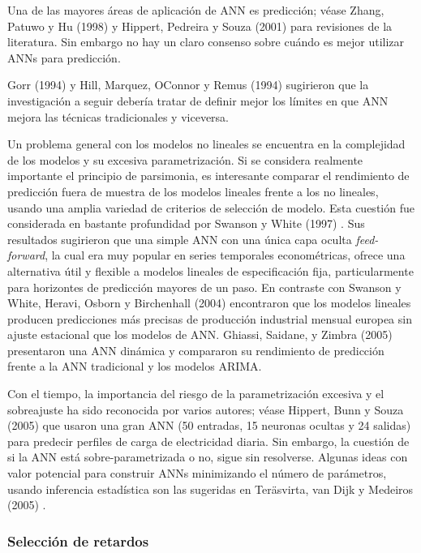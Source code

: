 \documentclass{llncs}
\begin{document}
Una de las mayores áreas de aplicación de ANN es predicción; véase Zhang, Patuwo y Hu (1998) \cite{Zhang199835} y Hippert, Pedreira y Souza (2001) \cite{Hippert200144} para revisiones de la literatura. Sin embargo no hay un claro consenso sobre cuándo es mejor utilizar ANNs para predicción.

Gorr (1994) \cite{Gorr19941} y Hill, Marquez, OConnor y Remus (1994) \cite{Hill19945} sugirieron que la investigación a seguir debería tratar de definir mejor los límites en que ANN mejora las técnicas tradicionales y viceversa. 

Un problema general con los modelos no lineales se encuentra en la complejidad de los modelos y su excesiva parametrización. Si se considera realmente importante el principio de parsimonia, es interesante comparar el rendimiento de predicción fuera de muestra de los modelos lineales frente a los no lineales, usando una amplia variedad de criterios de selección de modelo. Esta cuestión fue considerada en bastante profundidad por Swanson y White (1997) \cite{Swanson1997439}. Sus resultados sugirieron que una simple ANN con una única capa oculta \emph{feed-forward}, la cual era muy popular en series temporales econométricas, ofrece una alternativa útil y flexible a modelos lineales de especificación fija, particularmente para horizontes de predicción mayores de un paso. En contraste con Swanson y White, Heravi, Osborn y Birchenhall (2004) \cite{Heravi2004435} encontraron que los modelos lineales producen predicciones más precisas de producción industrial mensual europea sin ajuste estacional que los modelos de ANN. Ghiassi, Saidane, y Zimbra (2005) \cite{Ghiassi2005341} presentaron una ANN dinámica y compararon su rendimiento de predicción frente a la ANN tradicional y los modelos ARIMA.

Con el tiempo, la importancia del riesgo de la parametrización excesiva y el sobreajuste ha sido reconocida por varios autores; véase Hippert, Bunn y Souza (2005) \cite{Hippert2005425} que usaron una gran ANN (50 entradas, 15 neuronas ocultas y 24 salidas) para predecir perfiles de carga de electricidad diaria. Sin embargo, la cuestión de si la ANN está sobre-parametrizada o no, sigue sin resolverse. Algunas ideas con valor potencial para construir ANNs minimizando el número de parámetros, usando inferencia estadística son las sugeridas en Teräsvirta, van Dijk y Medeiros (2005) \cite{Terasvirta2005755}.

\subsubsection{Selección de retardos}
\end{document}
